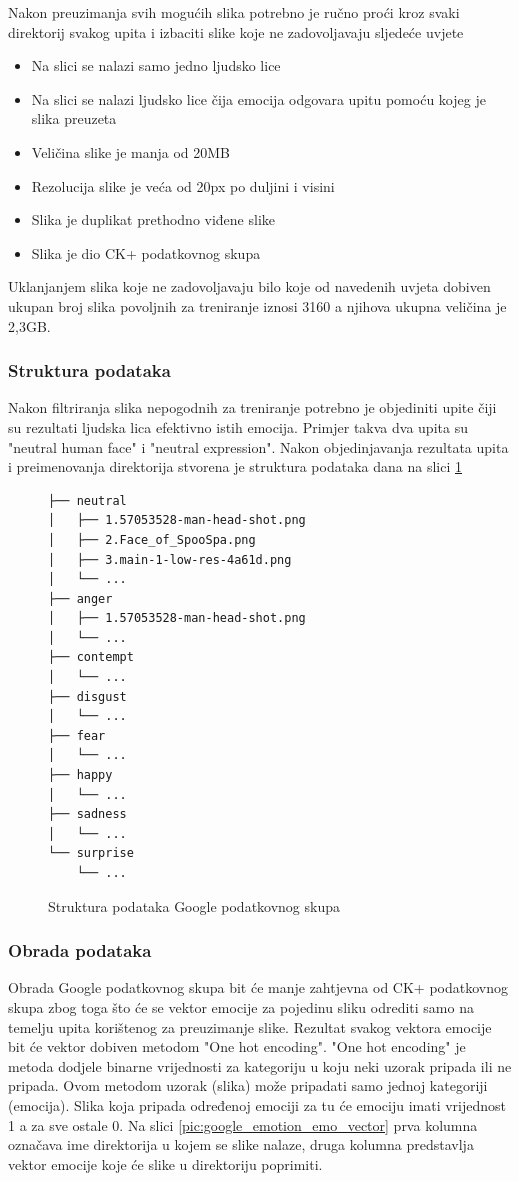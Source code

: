 \documentclass[times, utf8, zavrsni,numeric]{fer}
\begin{document}
\noindent
Nakon preuzimanja svih mogućih slika potrebno je ručno proći kroz svaki direktorij svakog upita i izbaciti slike koje ne zadovoljavaju sljedeće uvjete

\begin{itemize}
	\item Na slici se nalazi samo jedno ljudsko lice
	\item Na slici se nalazi ljudsko lice čija emocija odgovara upitu pomoću kojeg je slika preuzeta
	\item Veličina slike je manja od 20MB
	\item Rezolucija slike je veća od 20px po duljini i visini
	\item Slika je duplikat prethodno viđene slike
	\item Slika je dio CK+ podatkovnog skupa
\end{itemize}
Uklanjanjem slika koje ne zadovoljavaju bilo koje od navedenih uvjeta dobiven ukupan broj slika povoljnih za treniranje iznosi 3160 a njihova ukupna veličina je 2,3GB.

\subsubsection{Struktura podataka}
Nakon filtriranja slika nepogodnih za treniranje potrebno je objediniti upite čiji su rezultati ljudska lica efektivno istih emocija. Primjer takva dva upita su "neutral human face" i "neutral expression". Nakon objedinjavanja rezultata upita i preimenovanja direktorija stvorena je struktura podataka dana na slici \ref{cb:google_file_structure}


\begin{figure}[H]
\centering
\begin{Verbatim}[fontsize=\small]
├── neutral
│   ├── 1.57053528-man-head-shot.png
│   ├── 2.Face_of_SpooSpa.png
│   ├── 3.main-1-low-res-4a61d.png
│   └── ...
├── anger
│   ├── 1.57053528-man-head-shot.png
│   └── ...
├── contempt
│   └── ...
├── disgust
│   └── ...
├── fear
│   └── ...
├── happy
│   └── ...
├── sadness
│   └── ...
└── surprise
    └── ...
\end{Verbatim}
\caption{Struktura podataka Google podatkovnog skupa}
\label{cb:google_file_structure}
\end{figure}

\subsubsection{Obrada podataka}
Obrada Google podatkovnog skupa bit će manje zahtjevna od CK+ podatkovnog skupa zbog toga što će se vektor emocije za pojedinu sliku odrediti samo na temelju upita korištenog za preuzimanje slike. Rezultat svakog vektora emocije bit će vektor dobiven metodom "One hot encoding". "One hot encoding" je metoda dodjele binarne vrijednosti za kategoriju u koju neki uzorak pripada ili ne pripada\cite{one_hot_encoding}. Ovom metodom uzorak (slika) može pripadati samo jednoj kategoriji (emocija). Slika koja pripada određenoj emociji za tu će emociju imati vrijednost 1 a za sve ostale 0. Na slici \ref{pic:google_emotion_emo_vector} prva kolumna označava ime direktorija u kojem se slike nalaze, druga kolumna predstavlja vektor emocije koje će slike u direktoriju poprimiti.
\end{document}
